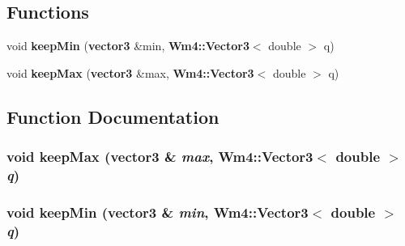 \subsection*{Functions}
\begin{CompactItemize}
\item 
void {\bf keep\-Min} ({\bf vector3} \&min, {\bf Wm4::Vector3}$<$ double $>$ q)
\item 
void {\bf keep\-Max} ({\bf vector3} \&max, {\bf Wm4::Vector3}$<$ double $>$ q)
\end{CompactItemize}


\subsection{Function Documentation}
\subsubsection{\setlength{\rightskip}{0pt plus 5cm}void keep\-Max ({\bf vector3} \& {\em max}, {\bf Wm4::Vector3}$<$ double $>$ {\em q})}\label{container_8cc_751c0c375dacc25e2bab815b767b3fb6}


\subsubsection{\setlength{\rightskip}{0pt plus 5cm}void keep\-Min ({\bf vector3} \& {\em min}, {\bf Wm4::Vector3}$<$ double $>$ {\em q})}\label{container_8cc_4ad0271730b851c04d73a2438d7730da}


